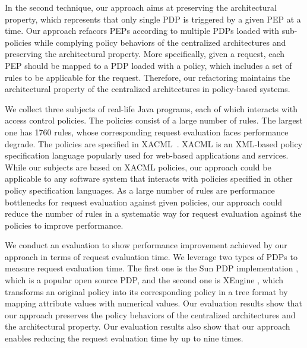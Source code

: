 In the second technique, our approach aims at preserving the architectural property, which represents that only single PDP is triggered by a given PEP at a time.
Our approach refacors PEPs according to multiple PDPs loaded with sub-policies while complying policy behaviors of the centralized architectures
and preserving the architectural property. More specifically, given a request, each PEP should be mapped to a PDP loaded with a policy, 
which includes a set of rules to be applicable for the request.
Therefore, our refactoring maintains the architectural property of the centralized architectures in policy-based systems.







We collect three subjects of real-life Java programs, each of which interacts
with access control policies. The policies consist of a large number of rules. The largest one has 1760 rules, whose corresponding request evaluation faces performance degrade.
The policies are specified in XACML~\cite{sunxacml}.
XACML is an XML-based policy specification language popularly used for web-based applications and services.
While our subjects are based on XACML policies,
our approach could be
applicable to any software system that interacts with policies specified in other
policy specification languages. As a large number of rules are performance bottlenecks for request evaluation
against given policies, our approach could reduce the number of rules in a systematic way for request evaluation against the policies to improve performance.



We conduct an evaluation to show performance improvement achieved by our approach in terms of request evaluation time.
We leverage two types of PDPs to measure request evaluation time. The first one is the
Sun PDP implementation \cite{oasis}, which is a popular open source PDP, and the second one is
XEngine \cite{Xengine}, which transforms an original policy
into its corresponding policy in a tree format by mapping attribute values with numerical values.
Our evaluation results show that our approach
preserves the policy behaviors of the centralized architectures and the architectural property. Our evaluation results also show that our approach
enables reducing the request evaluation time by up to nine times.


